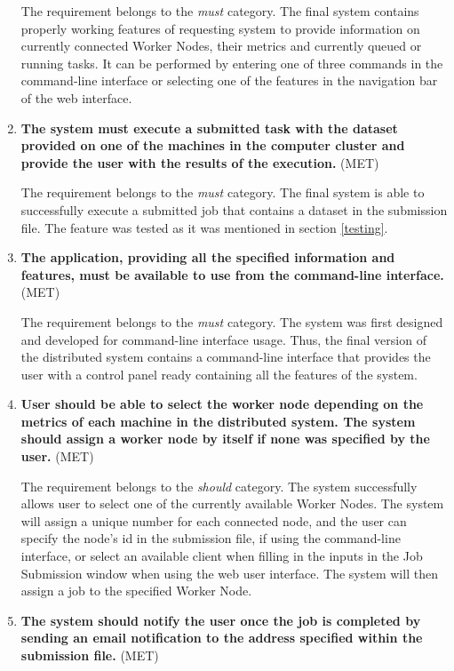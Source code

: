 \documentclass[10pt]{report}
\begin{document}
\begin{enumerate}
    The requirement belongs to the \textit{must} category. The final system contains properly working features of requesting system to provide information on currently connected Worker Nodes, their metrics and currently queued or running tasks. It can be performed by entering one of three commands in the command-line interface or selecting one of the features in the navigation bar of the web interface.

    \item \textbf{The system must execute a submitted task with the dataset provided on one of the machines in the computer cluster and provide the user with the results of the execution.} (MET)

    The requirement belongs to the \textit{must} category. The final system is able to successfully execute a submitted job that contains a dataset in the submission file. The feature was tested as it was mentioned in section \ref{testing}.

    \item \textbf{The application, providing all the specified information and features, must be available to use from the command-line interface.} (MET)

    The requirement belongs to the \textit{must} category. The system was first designed and developed for command-line interface usage. Thus, the final version of the distributed system contains a command-line interface that provides the user with a control panel ready containing all the features of the system.

    \item \textbf{User should be able to select the worker node depending on the metrics of each machine in the distributed system. The system should assign a worker node by itself if none was specified by the user.} (MET)

    The requirement belongs to the \textit{should} category. The system successfully allows user to select one of the currently available Worker Nodes. The system will assign a unique number for each connected node, and the user can specify the node's id in the submission file, if using the command-line interface, or select an available client when filling in the inputs in the Job Submission window when using the web user interface. The system will then assign a job to the specified Worker Node.

    \item \textbf{The system should notify the user once the job is completed by sending an email notification to the address specified within the submission file.} (MET)


\end{enumerate}
\end{document}
